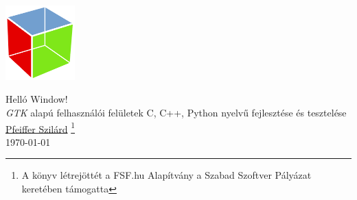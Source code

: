 \begin{center}

\vspace*{1.5cm}
\includegraphics[width=0.20\textwidth]{images/logo.png}
\vspace*{0.9cm}

\huge{Helló Window!}\\[0.3cm]
\large{\textit{GTK} alapú felhasználói felületek C, C++, Python nyelvű fejlesztése és tesztelése}\\[0.6cm]

\large{\href{http://pfeifferszilard.hu}{Pfeiffer Szilárd}}
\footnote{A könyv létrejöttét a FSF.hu Alapítvány a Szabad Szoftver Pályázat\cite{fsftender2011} keretében támogatta}\\[0.9cm]
\today

\end{center}

